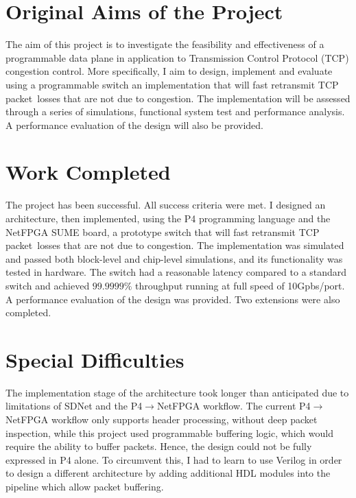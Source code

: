 
\section*{Original Aims of the Project}
The aim of this project is to investigate the feasibility and effectiveness of a programmable data plane in application to Transmission Control Protocol (TCP) congestion control. More specifically, I aim to design, implement and evaluate using a programmable switch an implementation that will fast retransmit TCP packet losses that are not due to congestion. The implementation will be assessed through a series of simulations, functional system test and performance analysis. A performance evaluation of the design will also be provided.  

\section*{Work Completed}
The project has been successful. All success criteria were met. I designed an architecture, then implemented, using the P4 programming language and the NetFPGA SUME board, a prototype switch that will fast retransmit TCP packet losses that are not due to congestion. The implementation was simulated and passed both block-level and chip-level simulations, and its functionality was tested in hardware. The switch had a reasonable latency compared to a standard switch and achieved $99.9999\%$ throughput running at full speed of 10Gpbs/port. A performance evaluation of the design was provided. Two extensions were also completed. 

\section*{Special Difficulties}
The implementation stage of the architecture took longer than anticipated due to limitations of SDNet and the P4$\rightarrow$NetFPGA workflow. The current P4$\rightarrow$NetFPGA workflow only supports header processing, without deep packet inspection, while this project used programmable buffering logic, which would require the ability to buffer packets. Hence, the design could not be fully expressed in P4 alone. To circumvent this, I had to learn to use Verilog in order to design a different architecture by adding additional HDL modules into the pipeline which allow packet buffering. 